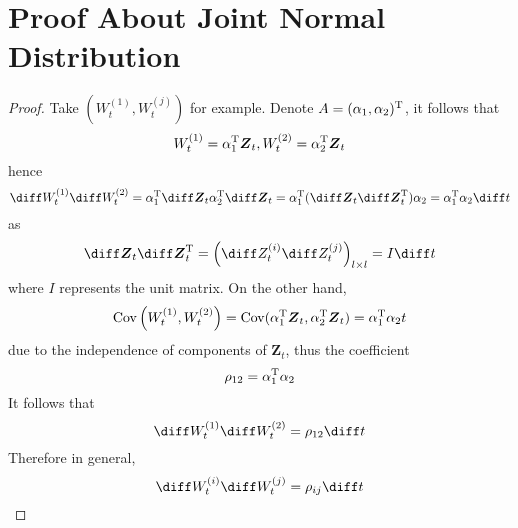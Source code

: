     \section{Proof About Joint Normal Distribution}
    \label{app:jn}
    \begin{proof}
        Take $(W_t^{(1)},W_t^{(j)})$ for example.
        Denote $A=(\alpha_1,\alpha_2)^\mathrm T$,
        it follows that
        \[W_t^{(1)}=\alpha_1^\mathrm T\boldsymbol Z_t,
        W_t^{(2)}=\alpha_2^\mathrm T\boldsymbol Z_t\]
        hence
        \[\diff W_t^{(1)}\diff W_t^{(2)}
        =\alpha_1^\trans\diff\boldsymbol Z_t
        \alpha_2^\trans\diff\boldsymbol Z_t
        =\alpha_1^\trans(\diff\boldsymbol Z_t\diff\boldsymbol Z_t^\trans)\alpha_2
        =\alpha_1^\trans\alpha_2\diff t
        \]
        as
        \[\diff\boldsymbol Z_t\diff\boldsymbol Z_t^\trans
        =\left(\diff Z_t^{(i)}\diff Z_t^{(j)}\right)_{l\times l}=I\diff t\]
        where $I$ represents the unit matrix.
        On the other hand,
        \[\mathrm{Cov}\left(W_t^{(1)},W_t^{(2)}\right)
        =\mathrm{Cov}(\alpha_1^\mathrm T\boldsymbol Z_t,\alpha_2^\mathrm T\boldsymbol Z_t)
        =\alpha_1^\mathrm T\alpha_2 t\]
        due to the independence of components of $\boldsymbol Z_t$,
        thus the coefficient
        \[\rho_{12}=\alpha_1^\mathrm T\alpha_2\]
        It follows that
        \[\diff W_t^{(1)}\diff W_t^{(2)}=\rho_{12}\diff t\]
        Therefore in general,
        \[\diff W_t^{(i)}\diff W_t^{(j)}=\rho_{ij}\diff t\]
    \end{proof}